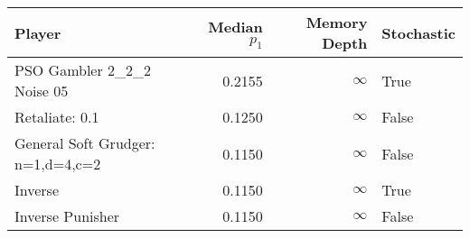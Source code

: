 \begin{tabular}{lrrl}
\toprule
                            Player &  Median $p_1$ &  Memory Depth & Stochastic \\
\midrule
        PSO Gambler 2\_2\_2 Noise 05 &        0.2155 &            \(\infty\) &       True \\
                    Retaliate: 0.1 &        0.1250 &            \(\infty\) &      False \\
 General Soft Grudger: n=1,d=4,c=2 &        0.1150 &            \(\infty\) &      False \\
                           Inverse &        0.1150 &            \(\infty\) &       True \\
                  Inverse Punisher &        0.1150 &            \(\infty\) &      False \\
\bottomrule
\end{tabular}
